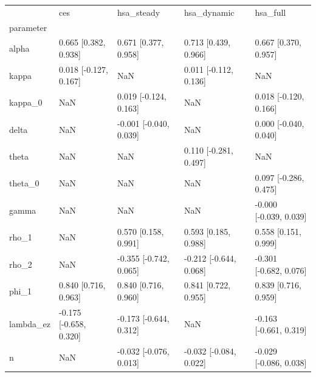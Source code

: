 \begin{tabular}{lllll}
\toprule
 & ces & hsa\_steady & hsa\_dynamic & hsa\_full \\
parameter &  &  &  &  \\
\midrule
alpha & 0.665 [0.382, 0.938] & 0.671 [0.377, 0.958] & 0.713 [0.439, 0.966] & 0.667 [0.370, 0.957] \\
kappa & 0.018 [-0.127, 0.167] & NaN & 0.011 [-0.112, 0.136] & NaN \\
kappa\_0 & NaN & 0.019 [-0.124, 0.163] & NaN & 0.018 [-0.120, 0.166] \\
delta & NaN & -0.001 [-0.040, 0.039] & NaN & 0.000 [-0.040, 0.040] \\
theta & NaN & NaN & 0.110 [-0.281, 0.497] & NaN \\
theta\_0 & NaN & NaN & NaN & 0.097 [-0.286, 0.475] \\
gamma & NaN & NaN & NaN & -0.000 [-0.039, 0.039] \\
rho\_1 & NaN & 0.570 [0.158, 0.991] & 0.593 [0.185, 0.988] & 0.558 [0.151, 0.999] \\
rho\_2 & NaN & -0.355 [-0.742, 0.065] & -0.212 [-0.644, 0.068] & -0.301 [-0.682, 0.076] \\
phi\_1 & 0.840 [0.716, 0.963] & 0.840 [0.716, 0.960] & 0.841 [0.722, 0.955] & 0.839 [0.716, 0.959] \\
lambda\_ez & -0.175 [-0.658, 0.320] & -0.173 [-0.644, 0.312] & NaN & -0.163 [-0.661, 0.319] \\
n & NaN & -0.032 [-0.076, 0.013] & -0.032 [-0.084, 0.022] & -0.029 [-0.086, 0.038] \\
\bottomrule
\end{tabular}
